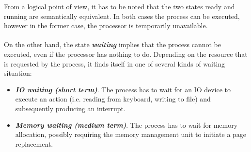\documentclass[11pt,a4paper]{scrreprt}
\begin{document}
From a logical point of view, it has to be noted that the two states ready and running are semantically equivalent. In both cases the process can be executed, however in the former case, the processor is temporarily unavailable.\\\\
On the other hand, the state \textbf{\textit{waiting}} implies that the process cannot be executed, even if the processor has nothing to do. Depending on the resource that is requested by the process, it finds itself in one of several kinds of waiting situation:
\begin{itemize}
\item \textbf{\textit{IO waiting (short term)}}. The process has to wait for an IO device to execute an action (i.e. reading from keyboard, writing to file) and subsequently producing an interrupt.
\item \textbf{\textit{Memory waiting (medium term)}}. The process has to wait for memory allocation, possibly requiring the memory management unit to initiate a page replacement.
\end{itemize}
\end{document}
